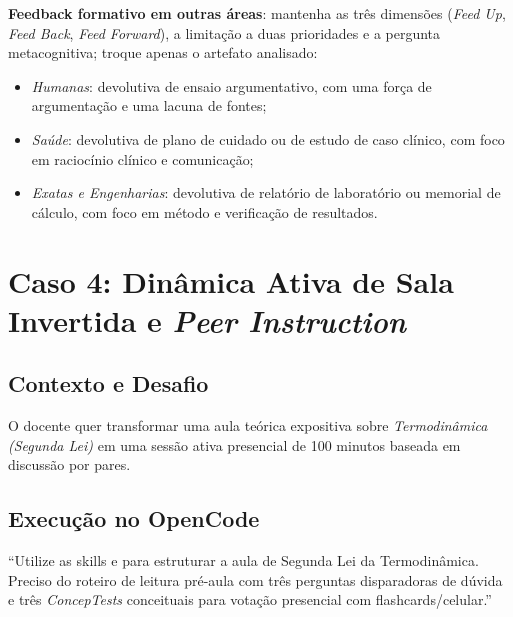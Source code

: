 \begin{adaptacaoarea}
\textbf{Feedback formativo em outras {\'a}reas}: mantenha as tr{\^e}s dimens{\~o}es (\emph{Feed Up}, \emph{Feed Back}, \emph{Feed Forward}), a limita{\c c}{\~a}o a duas prioridades e a pergunta metacognitiva; troque apenas o artefato analisado:
\begin{itemize}
  \item \emph{Humanas}: devolutiva de ensaio argumentativo, com uma for{\c c}a de argumenta{\c c}{\~a}o e uma lacuna de fontes;
  \item \emph{Sa{\'u}de}: devolutiva de plano de cuidado ou de estudo de caso cl{\'i}nico, com foco em racioc{\'i}nio cl{\'i}nico e comunica{\c c}{\~a}o;
  \item \emph{Exatas e Engenharias}: devolutiva de relat{\'o}rio de laborat{\'o}rio ou memorial de c{\'a}lculo, com foco em m{\'e}todo e verifica{\c c}{\~a}o de resultados.
\end{itemize}
\end{adaptacaoarea}

\section{Caso 4: Din{\^a}mica Ativa de Sala Invertida e \emph{Peer Instruction}}

\subsection{Contexto e Desafio}
O docente quer transformar uma aula te{\'o}rica expositiva sobre \emph{Termodin{\^a}mica (Segunda Lei)} em uma sess{\~a}o ativa presencial de 100 minutos baseada em discuss{\~a}o por pares.

\subsection{Execu{\c c}{\~a}o no OpenCode}
\begin{tcolorbox}[colback=white, colframe=boxborder, arc=1mm, title={Comando Enviado pelo Professor}]
\small
``Utilize as skills  e  para estruturar a aula de Segunda Lei da Termodin{\^a}mica. Preciso do roteiro de leitura pr{\'e}-aula com tr{\^e}s perguntas disparadoras de d{\'u}vida e tr{\^e}s \emph{ConcepTests} conceituais para vota{\c c}{\~a}o presencial com flashcards/celular.''
\end{tcolorbox}

